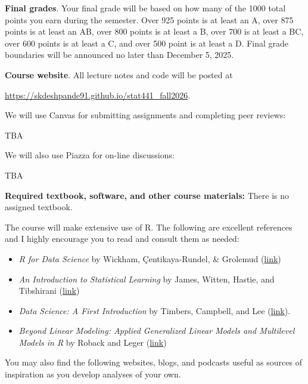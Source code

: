 \documentclass[11pt]{article}
\begin{document}
\textbf{Final grades}. Your final grade will be based on how many of the 1000 total points you earn during the semester.
Over 925 points is at least an A, over 875 points is at least an AB, over 800 points is at least a B, over 700 is at least a BC, over 600 points is at least a C, and over 500 point is at least a D.
Final grade boundaries will be announced no later than December 5, 2025.

\textbf{Course website}. All lecture notes and code will be posted at
\begin{center} \url{https://skdeshpande91.github.io/stat441\_fall2026}. \end{center}
We will use Canvas for submitting assignments and completing peer reviews:
\begin{center} TBA \end{center}

We will also use Piazza for on-line discussions:
\begin{center} TBA \end{center}


\textbf{Required textbook, software, and other course materials:} 
There is no assigned textbook. 

The course will make extensive use of \textsf{R}.
The following are excellent references and I highly encourage you to read and consult them as needed:
\begin{itemize}
\item{\textit{R for Data Science} by Wickham, \c{C}entikaya-Rundel, \& Grolemud (\href{https://r4ds.hadley.nz}{link})}
\item{\textit{An Introduction to Statistical Learning} by James, Witten, Hastie, and Tibshirani (\href{https://www.statlearning.com}{link})}
\item{\textit{Data Science: A First Introduction} by Timbers, Campbell, and Lee (\href{https://datasciencebook.ca}{link}).}
\item{\textit{Beyond Linear Modeling: Applied Generalized Linear Models and Multilevel Models in R} by Roback and Leger (\href{https://bookdown.org/roback/bookdown-BeyondMLR/}{link})}
\end{itemize}

You may also find the following websites, blogs, and podcasts useful as sources of inspiration as you develop analyses of your own.
\end{document}
